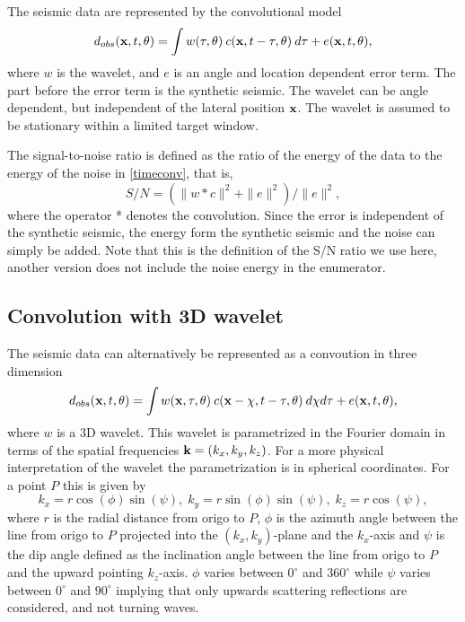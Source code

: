 The seismic data are represented by the convolutional model
%
\begin{equation} \label{timeconv}
   d_{obs}(\mathbf{x},t,\theta)
    =\int w(\tau,\theta) \: c(\mathbf{x},t-\tau,\theta) \: d\tau + e(\mathbf{x},t,\theta),
\end{equation}
%
where $w$ is the wavelet, and $e$ is an angle and location dependent
error term. The part before the error term is the synthetic seismic. The wavelet can be angle dependent, but independent of the
lateral position $\mathbf{x}$. The wavelet is assumed to be stationary
within a limited target window.

The signal-to-noise ratio is defined as the ratio of the energy of the data to the energy of the noise in 
\autoref{timeconv}, that is,
%
\begin{equation} \label{SNR}
   S/N =  \left(\| w * c\|^2+\| e\|^2\right) / \| e\|^2,
\end{equation}
%
\noindent
where the operator * denotes the convolution. Since the error is independent of the synthetic seismic, the energy form the synthetic seismic and the noise can simply be added. Note that this is the definition of the S/N ratio we use here, another version does not include the noise energy in the enumerator.

\subsection{Convolution with 3D wavelet}
The seismic data can alternatively be represented as a convoution in three dimension
%
\begin{equation} \label{3Dconv}
   d_{obs}(\mathbf{x},t,\theta)
    =\int w(\mathbf{x},\tau,\theta) \: c(\mathbf{x}-\mathbf{\chi},t-\tau,\theta) \: d\mathbf{\chi}d\tau + e(\mathbf{x},t,\theta),
\end{equation}
where $w$ is a 3D wavelet. This wavelet is parametrized in the Fourier domain in terms of the spatial frequencies $\mathbf{k}=(k_x, k_y, k_z)$. For a more physical interpretation of the wavelet the parametrization is in spherical coordinates. For a point $P$ this is given by
\begin{equation}
k_x=r\cos(\phi)\sin(\psi),\; k_y=r\sin(\phi)\sin(\psi),\; k_z=r\cos(\psi), \label{eq:spherical}
\end{equation}
where $r$ is the radial distance from origo to $P$, $\phi$ is the azimuth angle between the line from origo to $P$ projected into the $(k_x,k_y)$-plane and the $k_x$-axis and
$\psi$ is the dip angle defined as the inclination angle between the line from origo to $P$ and the upward pointing $k_z$-axis. $\phi$ varies between $0^{\circ}$ and $360^{\circ}$ while $\psi$ varies between $0^{\circ}$ and $90^{\circ}$ implying that only upwards scattering reflections are considered, and not turning waves.

